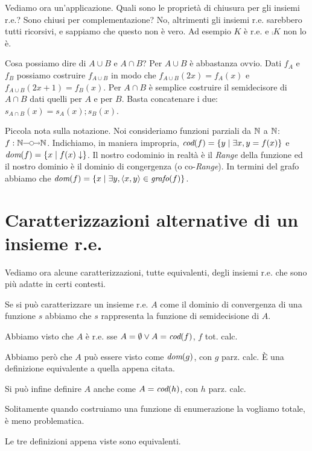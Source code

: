 Vediamo ora un'applicazione. Quali sono le proprietà di chiusura per gli insiemi r.e.? Sono chiusi
per complementazione? No, altrimenti gli insiemi r.e. sarebbero tutti ricorsivi, e sappiamo che
questo non è vero. Ad esempio $K$ è r.e. e $\comp{K}$ non lo è.

Cosa possiamo dire di $A \cup B$ e $A \cap B$? Per $A \cup B$ è abbastanza ovvio. Dati $f_{A}$ e
$f_{B}$ possiamo costruire $f_{A \cup B}$ in modo che $f_{A \cup B}(2x) = f_{A}(x)$ e $f_{A \cup
B}(2x + 1) = f_{B}(x)$. Per $A \cap B$ è semplice costruire il semidecisore di $A \cap B$ dati
quelli per $A$ e per $B$. Basta concatenare i due: $s_{A \cap B}(x) = s_{A}(x);s_{B}(x)$.

Piccola nota sulla notazione. Noi consideriamo funzioni parziali da $\mathbb{N}$ a $\mathbb{N}$: $f: \Nat
\partialto \Nat$. Indichiamo, in maniera impropria, $\textit{cod}(f) = \{y \mid \exists x, y = f(x)\}$ e
$\textit{dom}(f) = \{x \mid f(x) \downarrow\}$. Il nostro codominio in realtà è il \textit{Range} della
funzione ed il nostro dominio è il dominio di congergenza (o co-\textit{Range}). In termini del grafo abbiamo che $\textit{dom}(f)
= \{x \mid \exists y, \langle x, y \rangle \in \textit{grafo}(f)\}$.

\section{Caratterizzazioni alternative di un insieme r.e.}

Vediamo ora alcune caratterizzazioni, tutte equivalenti, degli insiemi r.e. che sono più adatte in
certi contesti.

Se si può caratterizzare un insieme r.e. $A$ come il dominio di convergenza di una funzione $s$ abbiamo
che $s$ rappresenta la funzione di semidecisione di $A$.

Abbiamo visto che $A$ è r.e. sse $A = \emptyset \lor A = \textit{cod}(f)$, $f$ tot. calc.

Abbiamo però che $A$ può essere visto come $\textit{dom}(g)$, con $g$ parz. calc. È una definizione
equivalente a quella appena citata.

Si può infine definire $A$ anche come $A = \textit{cod}(h)$, con $h$ parz. calc.

Solitamente quando costruiamo una funzione di enumerazione la vogliamo totale, è meno problematica.

Le tre definizioni appena viste sono equivalenti. 

